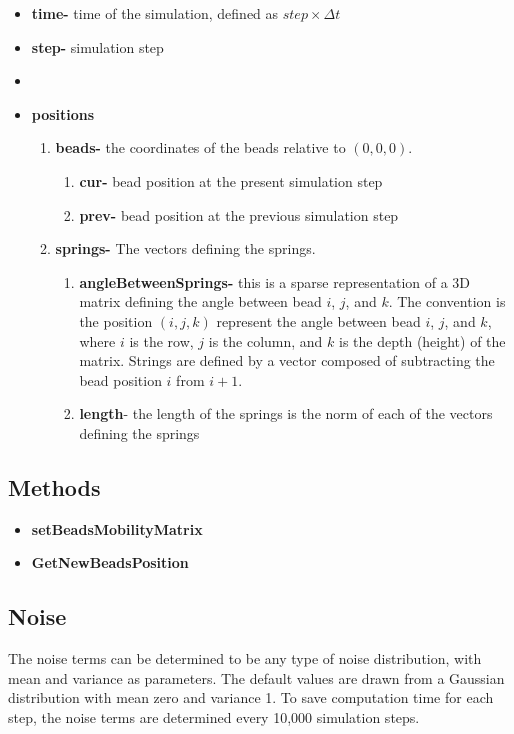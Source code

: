 \documentclass[12pt]{report}
\begin{document}
\begin{itemize}
\item{\textbf{time-}} time of the simulation, defined as $step\times\Delta t$
\item{\textbf{step-}} simulation step
\item{\textbf{}}
\item{\textbf{positions}}
\begin{enumerate}
\item{\textbf{beads-}} the coordinates of the beads relative to $(0,0,0)$.
\begin{enumerate}
\item{\textbf{cur-}} bead position at the present simulation step 
\item{\textbf{prev-}} bead position at the previous simulation step
\end{enumerate}
\item{\textbf{springs-}} The vectors defining the springs.
\begin{enumerate}
\item{\textbf{angleBetweenSprings-}} this is a sparse representation of a 3D matrix defining the angle between bead $i$, $j$, and $k$. The convention is the position $(i,j,k)$ represent the angle between bead $i$, $j$, and $k$, where $i$ is the row, $j$ is the column, and $k$ is the depth (height) of the matrix. Strings are defined by a vector composed of subtracting the bead position $i$ from $i+1$.
\item{\textbf{length}}- the length of the springs is the norm of each of the vectors defining the  springs
\end{enumerate}


\end{enumerate}
\end{itemize}

\subsection{Methods}
\begin{itemize}
\item{\textbf{setBeadsMobilityMatrix}}
\item{\textbf{GetNewBeadsPosition}}
\end{itemize}

\subsection{Noise} 
The noise terms can be determined to be any type of noise distribution, with mean and variance as parameters. The default values are drawn from a Gaussian distribution with mean zero and variance 1. 
To save computation time for each step, the noise terms are determined every 10,000 simulation steps. 
\end{document}
